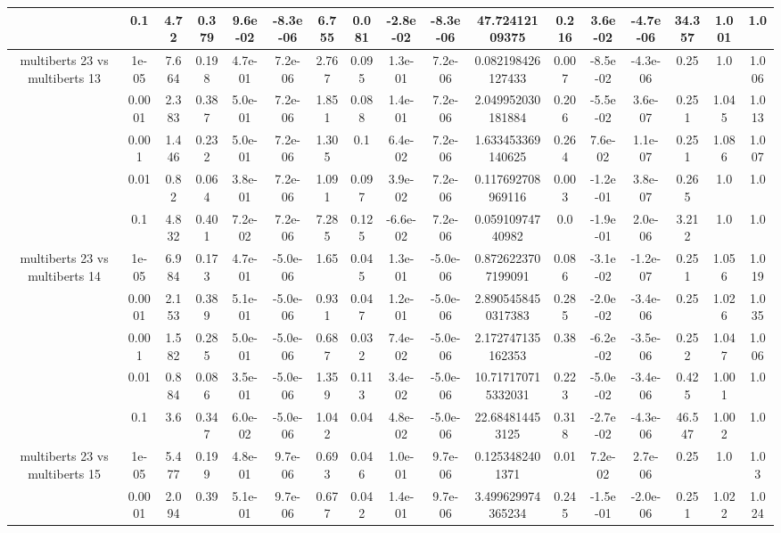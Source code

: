 \begin{tabular}{|c|c|c|c|c|c|c|c|c|c|c|c|c|c|c|c|c|}
 & 0.1 & 4.72 & 0.379 & 9.6e-02 & -8.3e-06 & 6.755 & 0.081 & -2.8e-02 & -8.3e-06 & 47.72412109375 & 0.216 & 3.6e-02 & -4.7e-06 & 34.357 & 1.001 & 1.0 \\
\hline
\multirow{5}{*}{multiberts 23 vs multiberts 13} & 1e-05 & 7.664 & 0.198 & 4.7e-01 & 7.2e-06 & 2.767 & 0.095 & 1.3e-01 & 7.2e-06 & 0.082198426127433 & 0.007 & -8.5e-02 & -4.3e-06 & 0.25 & 1.0 & 1.006 \\
 & 0.0001 & 2.383 & 0.387 & 5.0e-01 & 7.2e-06 & 1.851 & 0.088 & 1.4e-01 & 7.2e-06 & 2.049952030181884 & 0.206 & -5.5e-02 & 3.6e-07 & 0.251 & 1.045 & 1.013 \\
 & 0.001 & 1.446 & 0.232 & 5.0e-01 & 7.2e-06 & 1.305 & 0.1 & 6.4e-02 & 7.2e-06 & 1.633453369140625 & 0.264 & 7.6e-02 & 1.1e-07 & 0.251 & 1.086 & 1.007 \\
 & 0.01 & 0.82 & 0.064 & 3.8e-01 & 7.2e-06 & 1.091 & 0.097 & 3.9e-02 & 7.2e-06 & 0.117692708969116 & 0.003 & -1.2e-01 & 3.8e-07 & 0.265 & 1.0 & 1.0 \\
 & 0.1 & 4.832 & 0.401 & 7.2e-02 & 7.2e-06 & 7.285 & 0.125 & -6.6e-02 & 7.2e-06 & 0.05910974740982 & 0.0 & -1.9e-01 & 2.0e-06 & 3.212 & 1.0 & 1.0 \\
\hline
\multirow{5}{*}{multiberts 23 vs multiberts 14} & 1e-05 & 6.984 & 0.173 & 4.7e-01 & -5.0e-06 & 1.65 & 0.045 & 1.3e-01 & -5.0e-06 & 0.8726223707199091 & 0.086 & -3.1e-02 & -1.2e-07 & 0.251 & 1.056 & 1.019 \\
 & 0.0001 & 2.153 & 0.389 & 5.1e-01 & -5.0e-06 & 0.931 & 0.047 & 1.2e-01 & -5.0e-06 & 2.8905458450317383 & 0.285 & -2.0e-02 & -3.4e-06 & 0.25 & 1.026 & 1.035 \\
 & 0.001 & 1.582 & 0.285 & 5.0e-01 & -5.0e-06 & 0.687 & 0.032 & 7.4e-02 & -5.0e-06 & 2.172747135162353 & 0.38 & -6.2e-02 & -3.5e-06 & 0.252 & 1.047 & 1.006 \\
 & 0.01 & 0.884 & 0.086 & 3.5e-01 & -5.0e-06 & 1.359 & 0.113 & 3.4e-02 & -5.0e-06 & 10.717170715332031 & 0.223 & -5.0e-02 & -3.4e-06 & 0.425 & 1.001 & 1.0 \\
 & 0.1 & 3.6 & 0.347 & 6.0e-02 & -5.0e-06 & 1.042 & 0.04 & 4.8e-02 & -5.0e-06 & 22.684814453125 & 0.318 & -2.7e-02 & -4.3e-06 & 46.547 & 1.002 & 1.0 \\
\hline
\multirow{5}{*}{multiberts 23 vs multiberts 15} & 1e-05 & 5.477 & 0.199 & 4.8e-01 & 9.7e-06 & 0.693 & 0.046 & 1.0e-01 & 9.7e-06 & 0.1253482401371 & 0.01 & 7.2e-02 & 2.7e-06 & 0.25 & 1.0 & 1.03 \\
 & 0.0001 & 2.094 & 0.39 & 5.1e-01 & 9.7e-06 & 0.677 & 0.042 & 1.4e-01 & 9.7e-06 & 3.499629974365234 & 0.245 & -1.5e-01 & -2.0e-06 & 0.251 & 1.022 & 1.024 \\

\end{tabular}
